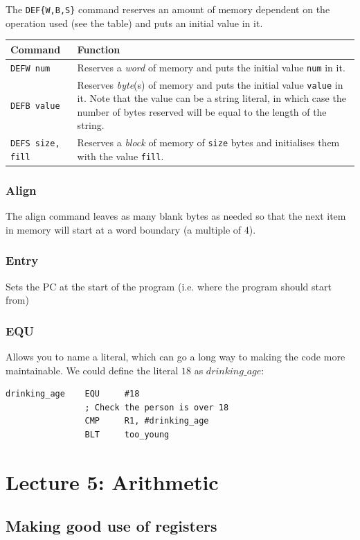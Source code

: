 \documentclass{article}
\begin{document}
The {\tt DEF\{W,B,S\}} command reserves an amount of memory dependent on the operation used (see the table) and puts an initial value in it.

\begin{tabularx}{\textwidth}{l|X}
	{\bf Command} & {\bf Function}\\ \hline
	{\tt DEFW num} & Reserves a {\it word} of memory and puts the initial value {\tt num} in it.\\ \hline
	{\tt DEFB value} & Reserves {\it byte}(s) of memory and puts the initial value {\tt value} in it. Note that the value can be a string literal, in which case the number of bytes reserved will be equal to the length of the string.\\ \hline
	{\tt DEFS size, fill} & Reserves a {\it block} of memory of {\tt size} bytes and initialises them with the value {\tt fill}. \\ \hline	
\end{tabularx}

\subsubsection{Align}
\label{subsubsec:align}
The align command leaves as many blank bytes as needed so that the next item in memory will start at a word boundary (a multiple of 4).

\subsubsection{Entry}
Sets the PC at the start of the program (i.e. where the program should start from)

\subsubsection{EQU}
Allows you to name a literal, which can go a long way to making the code more maintainable. We could define the literal $18$ as $drinking\_age$:

\begin{verbatim}
drinking_age	EQU 	#18
				; Check the person is over 18
				CMP 	R1, #drinking_age
				BLT		too_young
\end{verbatim}

\section{Lecture 5: Arithmetic}

\subsection{Making good use of registers}
\end{document}
